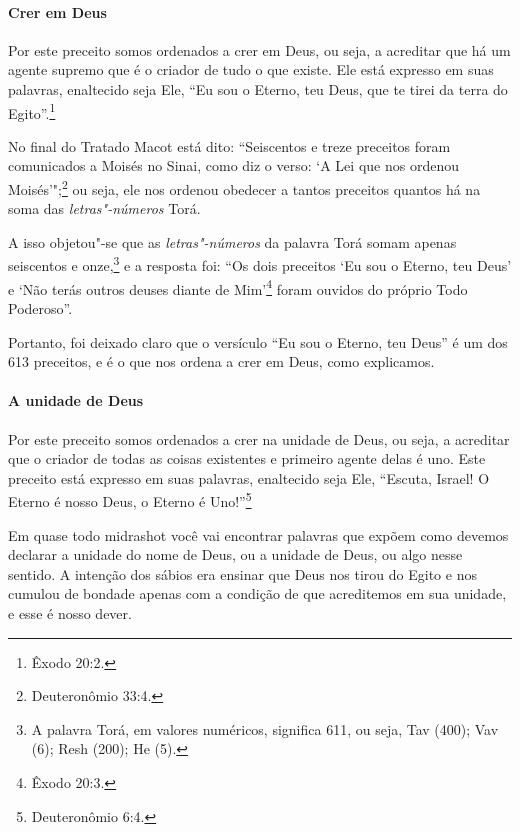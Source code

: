 \begin{multicols}{2}
\paragraph{Crer em Deus}

Por este preceito somos ordenados a crer em Deus, ou seja, a acreditar
que há um agente supremo que é o criador de tudo o que existe. Ele está
expresso em suas palavras, enaltecido seja Ele, ``Eu sou o Eterno, teu
Deus, que te tirei da terra do Egito''.\footnote{Êxodo 20:2.}

No final do Tratado Macot\starr{} está dito: ``Seiscentos e treze preceitos
foram comunicados a Moisés no Sinai, como diz o verso: `A Lei que nos
ordenou Moisés'";\footnote{Deuteronômio 33:4.} ou seja, ele nos ordenou obedecer a tantos preceitos quantos há na soma das \emph{letras"-números} Torá\starr. 

A isso objetou"-se que as \emph{letras"-números} da palavra Torá\starr{} somam apenas seiscentos e onze,\footnote{A palavra Torá\starr, em valores numéricos, significa 611, ou seja, Tav (400); Vav (6); Resh (200); He (5).} e a resposta foi: ``Os dois preceitos `Eu sou o Eterno, teu Deus' e `Não terás outros
deuses diante de Mim'\footnote{Êxodo 20:3.} foram ouvidos do próprio Todo
Poderoso''.

Portanto, foi deixado claro que o versículo ``Eu sou o Eterno, teu
Deus'' é um dos 613 preceitos, e é o que nos ordena a crer em Deus, como
explicamos.

\paragraph{A unidade de Deus}

Por este preceito somos ordenados a crer na unidade de Deus, ou seja, a
acreditar que o criador de todas as coisas existentes e primeiro agente
delas é uno. Este preceito está expresso em suas palavras, enaltecido
seja Ele, ``Escuta, Israel! O Eterno é nosso Deus, o Eterno é Uno!''\footnote{Deuteronômio 6:4.}

Em quase todo midrashot\starr{} você vai encontrar palavras que
expõem como devemos declarar a unidade do nome de Deus, ou a unidade
de Deus, ou algo nesse sentido. A intenção dos sábios era ensinar que
Deus nos tirou do Egito e nos cumulou de bondade apenas com a condição
de que acreditemos em sua unidade, e esse é nosso dever.


\end{multicols}
